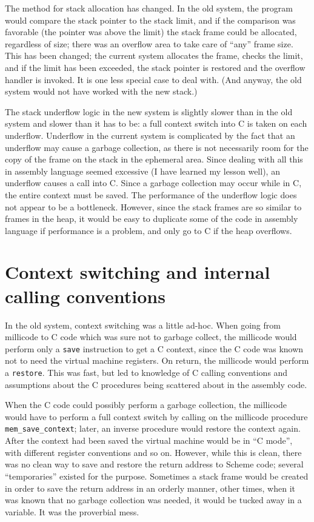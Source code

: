 The method for stack allocation has changed. In the old system, the program
would compare the stack pointer to the stack limit, and if the comparison
was favorable (the pointer was above the limit) the stack frame could be
allocated, regardless of size; there was an overflow area to take care of
``any'' frame size. This has been changed; the current system allocates the
frame, checks the limit, and if the limit has been exceeded, the stack
pointer is restored and the overflow handler is invoked. It is one less
special case to deal with. (And anyway, the old system would not have worked
with the new stack.)

The stack underflow logic in the new system is slightly slower than in the
old system and slower than it has to be: a full context switch into C is
taken on each underflow. Underflow in the current system is complicated by
the fact that an underflow may cause a garbage collection, as there is not
necessarily room for the copy of the frame on the stack in the ephemeral
area.  Since dealing with all this in assembly language seemed excessive (I
have learned my lesson well), an underflow causes a call into C. Since a
garbage collection may occur while in C, the entire context must be saved.
The performance of the underflow logic does not appear to be a bottleneck.
However, since the stack frames are so similar to frames in the heap, it
would be easy to duplicate some of the code in assembly language if
performance is a problem, and only go to C if the heap overflows.

\section{Context switching and internal calling conventions}

In the old system, context switching was a little ad-hoc. When going from
millicode to C code which was sure not to garbage collect, the millicode
would perform only a {\tt save} instruction to get a C context, since the C
code was known not to need the virtual machine registers. On return, the
millicode would perform a {\tt restore}. This was fast, but led to knowledge
of C calling conventions and assumptions about the C procedures being
scattered about in the assembly code.

When the C code could possibly perform a garbage collection, the millicode
would have to perform a full context switch by calling on the millicode
procedure \verb+mem_save_context+; later, an inverse procedure would restore
the context again. After the context had been saved the virtual machine
would be in ``C mode'', with different register conventions and so on.
However, while this is clean, there was no clean way to save and restore the
return address to Scheme code; several ``temporaries'' existed for the
purpose. Sometimes a stack frame would be created in order to save the
return address in an orderly manner, other times, when it was known that no
garbage collection was needed, it would be tucked away in a variable. It was
the proverbial mess.


